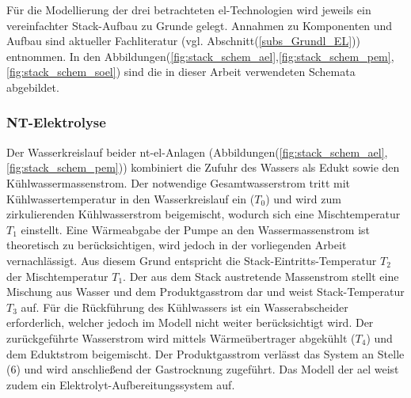 \documentclass[onecolumn,10pt,titlepage]{article}
\begin{document}
%
Für die Modellierung der drei betrachteten \gls{el}-Technologien wird jeweils ein vereinfachter Stack-Aufbau zu Grunde gelegt. Annahmen zu Komponenten und Aufbau sind aktueller Fachliteratur (vgl. Abschnitt(\ref{subs_Grundl_EL})) entnommen. In den Abbildungen(\ref{fig:stack_schem_ael},\ref{fig:stack_schem_pem},\ref{fig:stack_schem_soel}) sind die in dieser Arbeit verwendeten Schemata abgebildet.\\
\subsubsection{NT-Elektrolyse}
\label{subsubs_peri_schem_NT}
Der Wasserkreislauf beider \gls{nt}-\gls{el}-Anlagen (Abbildungen(\ref{fig:stack_schem_ael},\ref{fig:stack_schem_pem})) kombiniert die Zufuhr des Wassers als Edukt sowie den Kühlwassermassenstrom. Der notwendige Gesamtwasserstrom tritt mit Kühlwassertemperatur  in den Wasserkreislauf ein ($T_0$) und wird zum zirkulierenden Kühlwasserstrom beigemischt, wodurch sich eine Mischtemperatur $T_1$ einstellt. Eine Wärmeabgabe der Pumpe an den Wassermassenstrom ist theoretisch zu berücksichtigen, wird jedoch in der vorliegenden Arbeit vernachlässigt. Aus diesem Grund entspricht die Stack-Eintritts-Temperatur $T_2$ der Mischtemperatur $T_1$. Der aus dem Stack austretende Massenstrom stellt eine Mischung aus Wasser und dem Produktgasstrom dar und weist Stack-Temperatur $T_3$ auf. Für die Rückführung des Kühlwassers ist ein Wasserabscheider erforderlich, welcher jedoch im Modell nicht weiter berücksichtigt wird. Der zurückgeführte Wasserstrom wird mittels Wärmeübertrager abgekühlt ($T_4$) und dem Eduktstrom beigemischt. Der Produktgasstrom verlässt das System an Stelle (6) und wird anschließend der Gastrocknung zugeführt. Das Modell der \gls{ael} weist zudem ein Elektrolyt-Aufbereitungssystem auf.
\end{document}
